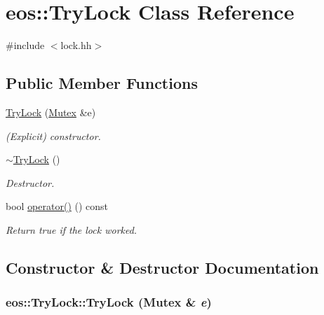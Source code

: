 \hypertarget{classeos_1_1TryLock}{
\section{eos::TryLock Class Reference}
\label{classeos_1_1TryLock}
}


{\ttfamily \#include $<$lock.hh$>$}\subsection*{Public Member Functions}
\begin{DoxyCompactItemize}
\item 
\hyperlink{classeos_1_1TryLock_a5f8bf57965139e53a558712b80a8a842}{TryLock} (\hyperlink{classeos_1_1Mutex}{Mutex} \&e)
\begin{DoxyCompactList}\small\item\em (Explicit) constructor. \item\end{DoxyCompactList}\item 
\hyperlink{classeos_1_1TryLock_a152750e617dbda392da45a234dd3c41f}{$\sim$TryLock} ()
\begin{DoxyCompactList}\small\item\em Destructor. \item\end{DoxyCompactList}\item 
bool \hyperlink{classeos_1_1TryLock_ac0b6b930a21cf09894d97883d352dee7}{operator()} () const 
\begin{DoxyCompactList}\small\item\em Return true if the lock worked. \item\end{DoxyCompactList}\end{DoxyCompactItemize}


\subsection{Constructor \& Destructor Documentation}
\hypertarget{classeos_1_1TryLock_a5f8bf57965139e53a558712b80a8a842}{
\subsubsection[{TryLock}]{\setlength{\rightskip}{0pt plus 5cm}eos::TryLock::TryLock ({\bf Mutex} \& {\em e})}}
\label{classeos_1_1TryLock_a5f8bf57965139e53a558712b80a8a842}



